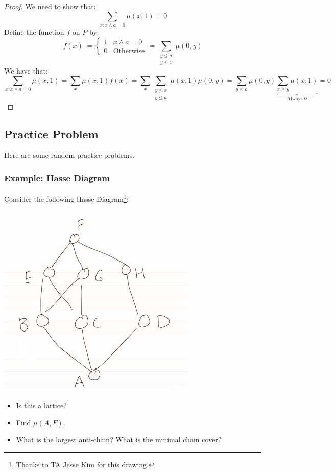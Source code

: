 \documentclass[letterpaper]{article}
\begin{document}
\begin{proof}
    We need to show that:
    \[\sum_{x: x \wedge a = 0} \mu(x, 1) = 0\]
    Define the function $f$ on $P$ by:
    \[f(x) := \begin{cases}
        1 & x \wedge a = 0 \\ 
        0 & \text{Otherwise}
    \end{cases} = \sum_{\substack{y \leq a \\ y \leq x}} \mu(0, y)\]
    We have that:
    \[\sum_{x: x \wedge a = 0} \mu(x, 1) = \sum_x \mu(x, 1)f(x) = \sum_x \sum_{\substack{y \leq x \\ y \leq a}} \mu(x, 1) \mu(0, y) = \sum_{y \leq a} \mu(0, y) \underbrace{\sum_{x \geq y} \mu(x, 1)}_{\text{Always } 0} = 0\]
\end{proof}

\subsection{Practice Problem}
Here are some random practice problems. 

\subsubsection{Example: Hasse Diagram}
Consider the following Hasse Diagram\footnote{Thanks to TA Jesse Kim for this drawing.}:
\begin{center}
    \includegraphics[scale=0.6]{img/mobius.PNG}
\end{center}
\begin{itemize}
    \item Is this a lattice? 
    \item Find $\mu(A, F)$. 
    \item What is the largest anti-chain? What is the minimal chain cover? 
\end{itemize}
\end{document}
